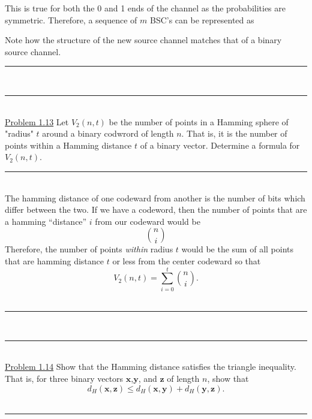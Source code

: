 \documentclass{article}
\newcommand{\problemsep}{\leavevmode\\[0.05in] \rule[\baselineskip/4]{\textwidth}{1pt} \\[0.005in] \rule[\baselineskip]{\textwidth}{1pt}\vspace{-\baselineskip}\leavevmode\\[0.05in]}
\newcommand{\statementsep}{\leavevmode\\[0.005in] \rule[\baselineskip/4]{\textwidth}{0.4pt}\leavevmode\\[0.005in]}
\begin{document}
This is true for both the 0 and 1 ends of the channel as the probabilities are symmetric. Therefore, a sequence of $m$ BSC's can be represented as
\begin{center}\end{center}
Note how the structure of the new source channel matches that of a binary source channel. 
\problemsep
\noindent\underline{Problem 1.13}
Let $V_2(n,t)$ be the number of points in a Hamming sphere of "radius" $t$ around a binary codwrord of length $n$. That is, it is the number of points within a Hamming distance $t$ of a binary vector. Determine a formula for $V_2(n,t)$.
\statementsep
The hamming distance of one codeward from another is the number of bits which differ between the two. If we have a codeword, then the number of points that are a hamming ``distance'' $i$ from our codeward  would be 
\begin{equation*}
	{n \choose i}
\end{equation*}
Therefore, the number of points {\it within} radius $t$ would be the sum of all points that are hamming distance $t$ or less from the center codeward so that
\begin{equation*}
	V_2(n,t) = \sum_{i = 0}^t{n\choose i}.
\end{equation*}
\problemsep
\noindent\underline{Problem 1.14}
Show that the Hamming distance satisfies the triangle inequality. That is, for three binary vectors $\mathbf{x}$,$\mathbf{y}$, and $\mathbf{z}$ of length $n$, show that
\begin{equation*}
	d_H(\mathbf{x},\mathbf{z})\le d_H(\mathbf{x},\mathbf{y}) + d_H(\mathbf{y},\mathbf{z}).
\end{equation*}
\statementsep
\end{document}
